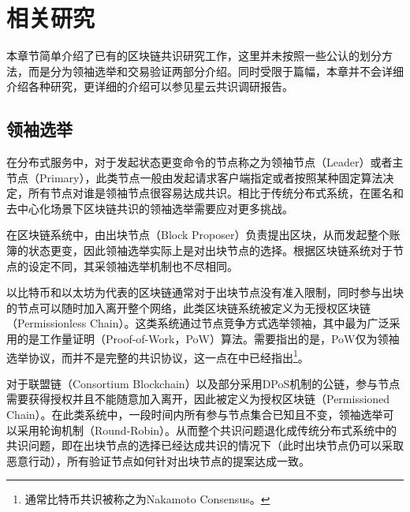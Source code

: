 \section{相关研究}
本章节简单介绍了已有的区块链共识研究工作，这里并未按照一些公认的划分方法\cite{wang2019survey,bano2017consensus}，而是分为领袖选举和交易验证两部分介绍。同时受限于篇幅，本章并不会详细介绍各种研究，更详细的介绍可以参见星云共识调研报告\cite{nebulassurvey2019}。

\subsection{领袖选举}
在分布式服务中，对于发起状态更变命令的节点称之为领袖节点（Leader）或者主节点（Primary），此类节点一般由发起请求客户端指定或者按照某种固定算法决定\cite{castro1999practical}，所有节点对谁是领袖节点很容易达成共识。相比于传统分布式系统，在匿名和去中心化场景下区块链共识的领袖选举需要应对更多挑战。%


在区块链系统中，由出块节点（Block Proposer）负责提出区块，从而发起整个账簿的状态更变，因此领袖选举实际上是对出块节点的选择\cite{gilad2017algorand}。根据区块链系统对于节点的设定不同，其采领袖选举机制也不尽相同。

以比特币\cite{nakamoto2008bitcoin}和以太坊\cite{wood2014ethereum}为代表的区块链通常对于出块节点没有准入限制，同时参与出块的节点可以随时加入离开整个网络，此类区块链系统被定义为无授权区块链（Permissionless Chain）\cite{pass2017rethinking}。这类系统通过节点竞争方式选举领袖，其中最为广泛采用的是工作量证明（Proof-of-Work，PoW）算法。需要指出的是，PoW仅为领袖选举协议，而并不是完整的共识协议，这一点在\cite{nakamoto2008bitcoin}中已经指出\footnote{通常比特币共识被称之为Nakamoto Consensus。}。

对于联盟链（Consortium Blockchain）以及部分采用DPoS机制的公链\cite{grigg2017eos}，参与节点需要获得授权并且不能随意加入离开，因此被定义为授权区块链（Permissioned Chain）\cite{pass2017rethinking}。在此类系统中，一段时间内所有参与节点集合已知且不变，领袖选举可以采用轮询机制（Round-Robin）\cite{castro1999practical}。从而整个共识问题退化成传统分布式系统中的共识问题，即在出块节点的选择已经达成共识的情况下（此时出块节点仍可以采取恶意行动），所有验证节点如何针对出块节点的提案达成一致。

